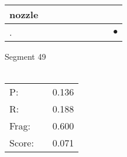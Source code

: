 \documentclass[landscape]{article}
\newcommand{\ssp}{\hspace{2pt}}
\newcommand{\mex}{\cellcolor{g}$\bullet$}
\begin{document}
\begin{tabular}{|l|p{10pt}|p{10pt}|p{10pt}|p{10pt}|p{10pt}|p{10pt}|p{10pt}|p{10pt}|}
\hline
\ssp nozzle \ssp&\hspace{2pt}&\hspace{2pt}&\hspace{2pt}&\hspace{2pt}&\hspace{2pt}&\hspace{2pt}&\hspace{2pt}&\hspace{2pt}\\
\hline
\ssp \cellcolor{ref7}. \ssp&\hspace{2pt}&\hspace{2pt}&\hspace{2pt}&\hspace{2pt}&\hspace{2pt}&\hspace{2pt}&\hspace{2pt}&\hspace{2pt}\mex\\
\hline
\end{tabular}

\vspace{6pt}
\noindent Segment 49\\\\
\noindent\begin{tabular}{lm{12pt}r}
\hline
P:&&0.136\\
R:&&0.188\\
Frag:&&0.600\\
Score:&&0.071\\
\end{tabular}

\newpage
\end{document}
